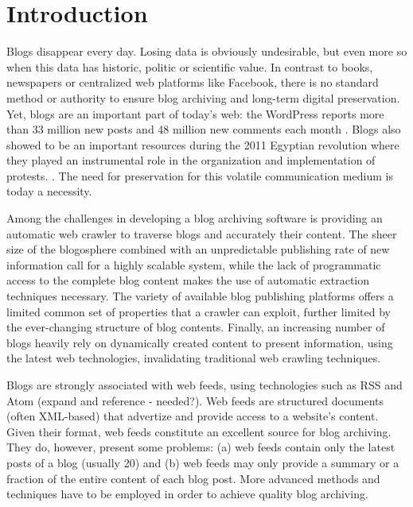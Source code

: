 \section{Introduction}

Blogs disappear every day. Losing data is obviously undesirable, but even more so when this data has historic, politic or scientific value. In contrast to books, newspapers or centralized web platforms like Facebook, there is no standard method or authority to ensure blog archiving and long-term digital preservation. Yet, blogs are an important part of today's web: the WordPress reports more than 33 million new posts and 48 million new comments each month \cite{wordpress2014}. Blogs also showed to be an important resources during the 2011 Egyptian revolution where they played an instrumental role in the organization and implementation of protests. \cite{nahedeltantawy2012}. The need for preservation for this volatile communication medium is today a necessity.

Among the challenges in developing a blog archiving software is providing an automatic web crawler to traverse blogs and accurately their content. The sheer size of the blogosphere combined with an unpredictable publishing rate of new information call for a highly scalable system, while the lack of programmatic access to the complete blog content makes the use of automatic extraction techniques necessary. The variety of available blog publishing platforms offers a limited common set of properties that a crawler can exploit, further limited by the ever-changing structure of blog contents. Finally, an increasing number of blogs heavily rely on dynamically created content to present information, using the latest web technologies, invalidating traditional web crawling techniques.

Blogs are strongly associated with web feeds, using technologies such as RSS and Atom (expand and reference - needed?). Web feeds are structured documents (often XML-based) that advertize and provide access to a website's content. Given their format, web feeds constitute an excellent source for blog archiving. They do, however, present some problems: (a) web feeds contain only the latest posts of a blog (usually 20) and (b) web feeds may only provide a summary or a fraction of the entire content of each blog post. More advanced methods and techniques have to be employed in order to achieve quality blog archiving.


